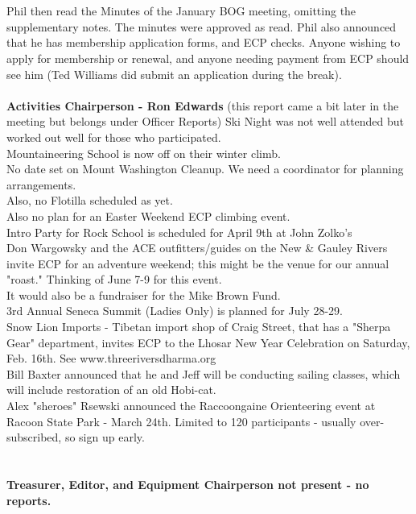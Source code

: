 \documentclass[10pt,a4paper]{article}
\begin{document}
\\
\\
Phil then read the Minutes of the January BOG meeting, omitting the supplementary notes. The minutes were approved as read. Phil also announced that he has membership application forms, and ECP checks.  Anyone wishing to apply for membership or renewal, and anyone needing payment from ECP should see him  (Ted Williams did submit an application during the break).
\\
\\
\textbf{Activities Chairperson - Ron Edwards} (this report came a bit later in the meeting but belongs under Officer Reports) 
Ski Night was not well attended but worked out well for those who participated. \\
Mountaineering School is now off on their winter climb.\\
No date set on Mount Washington Cleanup.  We need a coordinator for planning arrangements.\\
Also, no Flotilla scheduled as yet.\\
Also no plan for an Easter Weekend ECP climbing event.\\
Intro Party for Rock School is scheduled for April 9th at John Zolko's\\
Don Wargowsky and the ACE outfitters/guides on the New \& Gauley Rivers invite ECP for an adventure weekend; this might be the venue for our annual "roast." Thinking of June 7-9 for this event. \\
It would also be a fundraiser for the Mike Brown Fund. \\
3rd Annual Seneca Summit (Ladies Only) is planned for July 28-29. \\
Snow Lion Imports - Tibetan import shop of Craig Street, that has a "Sherpa Gear" department, invites ECP to the Lhosar New Year Celebration on Saturday, Feb. 16th.  See www.threeriversdharma.org \\
Bill Baxter announced that he and Jeff will be conducting sailing classes, which will include restoration of an old  Hobi-cat. \\
Alex "sheroes" Rsewski  announced the Raccoongaine Orienteering event at Racoon State Park - March 24th.  Limited to 120 participants - usually over-subscribed, so sign up early.  \\
\\
\\
\textbf{Treasurer,  Editor, and Equipment Chairperson not present - no reports.}
\end{document}
